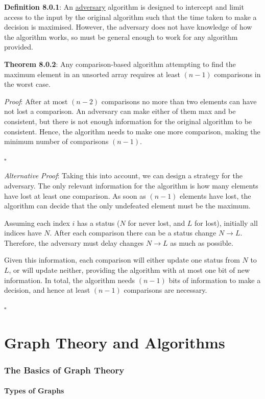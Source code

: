 \documentclass{article}
\newcommand{\separate}[1] {\vspace{#1 pt}\noindent}
\newcommand{\definition}[2]{\textbf{Definition #1}: #2\label{def:#1}}
\newcommand{\proof}[2]{\textit{Proof}: #2 \begin{flushright}\(\square\)\end{flushright}\label{prf:#1}}
\newcommand{\theorem}[3]{\textbf{Theorem #1}: #2 \par\separate{3}\proof{thm:#1}{#3}\label{thm:#1}}
\begin{document}
\separate{7}\definition{8.0.1}{An \underline{adversary} algorithm is designed to intercept and limit access to the input by the original algorithm such that the time taken to make a decision is maximised. However, the adversary does not have knowledge of how the algorithm works, so must be general enough to work for any algorithm provided.}

\separate{7}\theorem{8.0.2}{Any comparison-based algorithm attempting to find the maximum element in an unsorted array requires at least \((n-1)\) comparisons in the worst case.}
{After at most \((n-2)\) comparisons no more than two elements can have not lost a comparison. An adversary can make either of them max and be consistent, but there is not enough information for the original algorithm to be consistent. Hence, the algorithm needs to make one more comparison, making the minimum number of comparisons \((n-1)\).}
\textit{Alternative }\proof{alt:thm:8.0.2}{Taking this into account, we can design a strategy for the adversary. The only relevant information for the algorithm is how many elements have lost at least one comparison. As soon as \((n-1)\) elements have lost, the algorithm can decide that the only undefeated element must be the maximum. 

Assuming each index \(i\) has a status (\(N\) for never lost, and \(L\) for lost), initially all indices have \(N\). After each comparison there can be a status change \(N\rightarrow L\). Therefore, the adversary must delay changes \(N\rightarrow L\) as much as possible. 

Given this information, each comparison will either update one status from \(N\) to \(L\), or will update neither, providing the algorithm with at most one bit of new information. In total, the algorithm needs \((n-1)\) bits of information to make a decision, and hence at least \((n-1)\) comparisons are necessary.}

\newpage\part{Graph Theory and Algorithms}\label{part:4.gta}

\section{The Basics of Graph Theory}

\subsection{Types of Graphs}
\end{document}
